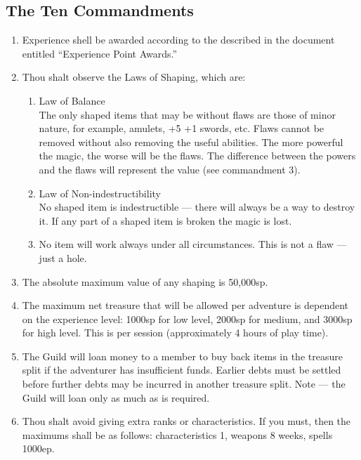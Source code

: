\documentclass{article}
\begin{document}
\begin{multicols}{2}
\section{The Ten Commandments}

\begin{enumerate}

\item
Experience shell be awarded according to the described in the document
entitled ``Experience Point Awards.''

\item
Thou shalt observe the Laws of Shaping, which are:
\begin{enumerate}
\item
Law of Balance \\
The only shaped items that may be without flaws are those of minor
nature, for example, amulets, +5 +1 swords, etc.  Flaws cannot
be removed without also removing the useful abilities.  The more
powerful the magic, the worse will be the flaws.  The difference
between the powers and the flaws will represent the value (see
commandment 3).

\item
Law of Non-indestructibility \\
No shaped item is indestructible --- there will always be a way to
destroy it.  If any part of a shaped item is broken the magic is lost.

\item
No item will work always under all circumstances.  This is not a flaw
--- just a hole.

\end{enumerate}

\item
The absolute maximum value of any shaping is 50,000sp.

\item
The maximum net treasure that will be allowed per adventure is
dependent on the experience level: 1000sp for low level, 2000sp for
medium, and 3000sp for high level.  This is per session (approximately
4 hours of play time).

\item
The Guild will loan money to a member to buy back items in the
treasure split if the adventurer has insufficient funds.  Earlier
debts must be settled before further debts may be incurred in another
treasure split.  Note --- the Guild will loan only as much as is
required.

\item
Thou shalt avoid giving extra ranks or characteristics.  If you must,
then the maximums shall be as follows: characteristics 1, weapons 8
weeks, spells 1000ep.


\end{enumerate}
\end{multicols}
\end{document}
